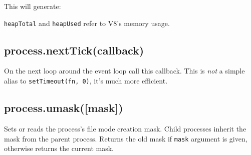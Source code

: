 This will generate:

\begin{Shaded}
\begin{Highlighting}[]
\NormalTok{\{ }\NormalTok{: }\NormalTok{,}
  \NormalTok{: }\NormalTok{,}
  \NormalTok{: } \NormalTok{\}}
\end{Highlighting}
\end{Shaded}

\texttt{heapTotal} and \texttt{heapUsed} refer to V8's memory usage.

\subsection{process.nextTick(callback)}

On the next loop around the event loop call this callback. This is
\emph{not} a simple alias to \texttt{setTimeout(fn, 0)}, it's much more
efficient.

\begin{Shaded}
\begin{Highlighting}[]
\NormalTok{(} \NormalTok{() \{}
  \NormalTok{(}\NormalTok{);}
\NormalTok{\});}
\end{Highlighting}
\end{Shaded}

\subsection{process.umask({[}mask{]})}

Sets or reads the process's file mode creation mask. Child processes
inherit the mask from the parent process. Returns the old mask if
\texttt{mask} argument is given, otherwise returns the current mask.

\begin{Shaded}
\begin{Highlighting}[]
 \NormalTok{;}

\NormalTok{(} \NormalTok{+ }\NormalTok{(}\NormalTok{) +}
             \NormalTok{+ }\NormalTok{(}\NormalTok{));}
\end{Highlighting}
\end{Shaded}

